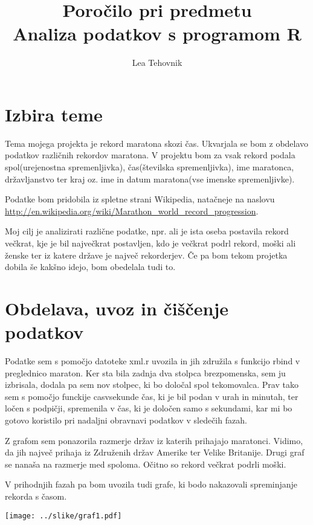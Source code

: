 \documentclass[11pt,a4paper]{article}
\begin{document}
\title{Poročilo pri predmetu \\
Analiza podatkov s programom R}
\author{Lea Tehovnik}
\maketitle

\section{Izbira teme}

Tema mojega projekta je rekord maratona skozi čas. Ukvarjala se bom z obdelavo podatkov različnih rekordov maratona. V projektu bom za vsak rekord podala spol(urejenostna spremenljivka), čas(številska spremenljivka), ime maratonca, državljanstvo ter kraj oz. ime in datum maratona(vse imenske spremenljivke).

Podatke bom pridobila iz spletne strani Wikipedia, natačneje na naslovu \url{http://en.wikipedia.org/wiki/Marathon_world_record_progression}.

Moj cilj je analizirati različne podatke, npr. ali je ista oseba postavila rekord večkrat, kje je bil največkrat postavljen, kdo je večkrat podrl rekord, moški ali ženske ter iz katere države je največ rekorderjev. Če pa bom tekom projetka dobila še kakšno idejo, bom obedelala tudi to.

\section{Obdelava, uvoz in čiščenje podatkov}

Podatke sem s pomočjo datoteke xml.r uvozila in jih združila s funkcijo rbind v preglednico maraton. Ker sta bila zadnja dva stolpca brezpomenska, sem ju izbrisala, dodala pa sem nov stolpec, ki bo določal spol tekomovalca. Prav tako sem s pomočjo funckije casvsekunde čas, ki je bil podan v urah in minutah, ter ločen s podpičji, spremenila v čas, ki je določen samo s sekundami, kar mi bo gotovo koristilo pri nadaljni obravnavi podatkov v sledečih fazah.

Z grafom sem ponazorila razmerje držav iz katerih prihajajo maratonci. Vidimo, da jih največ prihaja iz Združenih držav Amerike ter Velike Britanije.
Drugi graf se nanaša na razmerje med spoloma. Očitno so rekord večkrat podrli moški. 

V prihodnjih fazah pa bom uvozila tudi grafe, ki bodo nakazovali spreminjanje rekorda s časom.

\texttt{[image: ../slike/graf1.pdf]}
\end{document}
